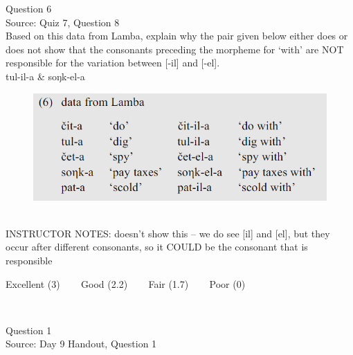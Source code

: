 \documentclass[12pt]{article}
\begin{document}
{\large Question 6}\\

Source: Quiz 7, Question 8\\

Based on this data from Lamba, explain why the pair given below either does or does not show that the consonants preceding the morpheme for `with' are NOT responsible for the variation between [-il] and [-el].\\

tul-il-a \& soŋk-el-a

\begin{figure}[H]
\includegraphics{../images/peng119_lamba.png}
\end{figure}

~\\
INSTRUCTOR NOTES: doesn't show this -- we do see [il] and [el], but they occur after different consonants, so it COULD be the consonant that is responsible


\vfill
Excellent (3) ~~~ Good (2.2) ~~~ Fair (1.7) ~~~ Poor (0)
\newpage

\begin{center}
\textbf{{\color{red}{\HUGE END OF EXAM}}}\\

\end{center}
\newpage

\begin{center}
\textbf{{\color{blue}{\HUGE START OF EXAM\\}}}

\textbf{{\color{blue}{\HUGE Student ID: 1715\\}}}

\textbf{{\color{blue}{\HUGE 11:50 AM - 12:10 PM\\}}}

\end{center}
\newpage

{\large Question 1}\\

Source: Day 9 Handout, Question 1\\
\end{document}
